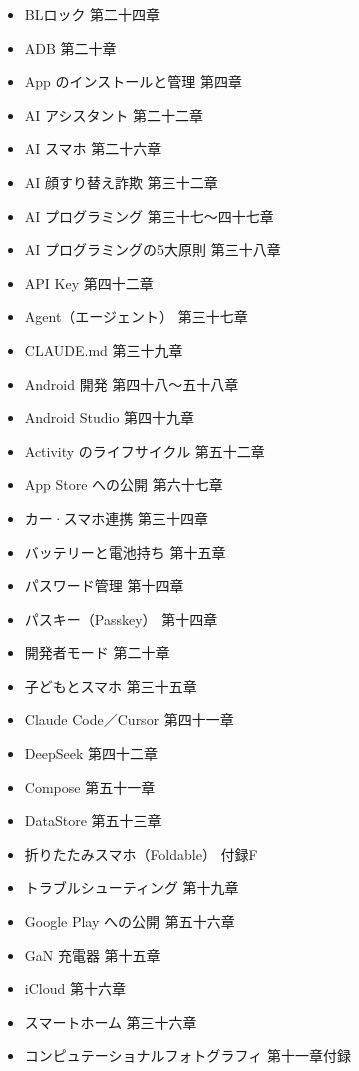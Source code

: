 


\begin{itemize}
  \item BLロック 第二十四章
  \item ADB 第二十章
  \item App のインストールと管理 第四章
  \item AI アシスタント 第二十二章
  \item AI スマホ 第二十六章
  \item AI 顔すり替え詐欺 第三十二章
  \item AI プログラミング 第三十七〜四十七章
  \item AI プログラミングの5大原則 第三十八章
  \item API Key 第四十二章
  \item Agent（エージェント） 第三十七章
  \item CLAUDE.md 第三十九章
  \item Android 開発 第四十八〜五十八章
  \item Android Studio 第四十九章
  \item Activity のライフサイクル 第五十二章
  \item App Store への公開 第六十七章
\end{itemize}


\begin{itemize}
  \item カー·スマホ連携 第三十四章
  \item バッテリーと電池持ち 第十五章
  \item パスワード管理 第十四章
  \item パスキー（Passkey） 第十四章
  \item 開発者モード 第二十章
  \item 子どもとスマホ 第三十五章
  \item Claude Code／Cursor 第四十一章
  \item DeepSeek 第四十二章
  \item Compose 第五十一章
  \item DataStore 第五十三章
\end{itemize}


\begin{itemize}
  \item 折りたたみスマホ（Foldable） 付録F
  \item トラブルシューティング 第十九章
  \item Google Play への公開 第五十六章
  \item GaN 充電器 第十五章
  \item iCloud 第十六章
  \item スマートホーム 第三十六章
  \item コンピュテーショナルフォトグラフィ 第十一章付録
\end{itemize}

